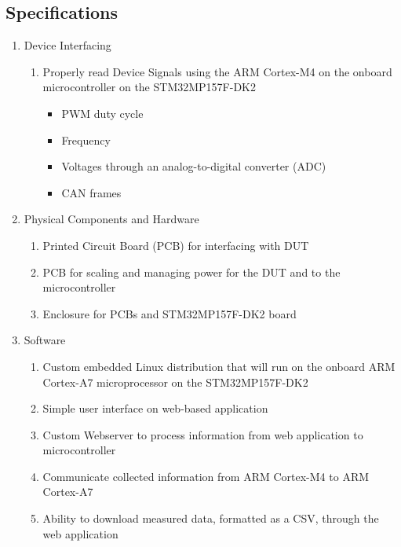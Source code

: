\documentclass[12pt]{article}
\begin{document}
\subsection{Specifications}
\begin{enumerate}[label=\arabic*.]
    \item Device Interfacing
        \begin{enumerate}[label=\theenumi.\arabic*]
            \item Properly read Device Signals using the ARM Cortex-M4 on the onboard 
                  microcontroller on the STM32MP157F-DK2
                \begin{itemize}
                    \item PWM duty cycle
                    \item Frequency
                    \item Voltages through an analog-to-digital converter (ADC)
                    \item CAN frames
                \end{itemize}
        \end{enumerate}

    \item Physical Components and Hardware
        \begin{enumerate}[label=\theenumi.\arabic*]
            \item Printed Circuit Board (PCB) for interfacing with DUT
            \item PCB for scaling and managing power for the DUT and to the 
                  microcontroller
            \item Enclosure for PCBs and STM32MP157F-DK2 board
        \end{enumerate}

    \item Software
        \begin{enumerate}[label=\theenumi.\arabic*]
            \item Custom embedded Linux distribution that will run on the onboard ARM 
                  Cortex-A7 microprocessor on the STM32MP157F-DK2
            \item Simple user interface on web-based application
            \item Custom Webserver to process information from web application to 
                  microcontroller
            \item Communicate collected information from ARM Cortex-M4 to ARM 
                  Cortex-A7
            \item Ability to download measured data, formatted as a CSV, through the 
                  web application
        \end{enumerate}
\end{enumerate}
\end{document}
